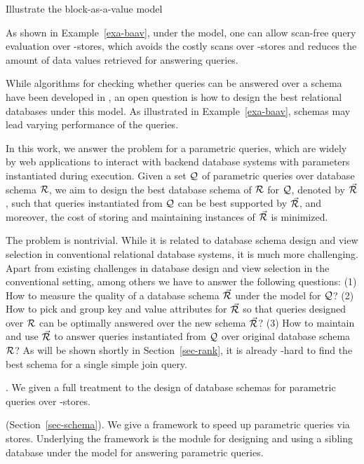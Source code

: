{\begin{example}\label{exa-baav}
Illustrate the block-as-a-value model 
\end{example}

As shown in Example~\ref{exa-baav}, under the \baav
model, one can allow scan-free query evaluation over \kv-stores,
which avoids the costly scans over \kv-stores and reduces the
amount of data values retrieved for answering \SQL queries. 

While algorithms for checking whether queries can be answered
over a \baav 
schema have been developed in
\cite{VLDB19}, an open question is how to design the best
relational databases under this model. As illustrated in
Example~\ref{exa-baav}, schemas may lead varying performance of
the queries.

In this work, we answer the problem for a parametric
queries, which are widely by web applications to interact with
backend database systems with parameters instantiated during
execution. Given a set $\mathcal Q$ of parametric queries over database
schema ${\mathcal R}$, we aim to design the best \baav
database schema of ${\mathcal R}$ for $\mathcal Q$, denoted by $\vec{{\mathcal R}}$,
such that queries instantiated from $\mathcal Q$ can be best supported by
$\vec{{\mathcal R}}$, and moreover, the cost of storing and maintaining
instances of $\vec{{\mathcal R}}$ is minimized. 

The problem is nontrivial. While it is related to \eg database
schema design and view selection in conventional relational
database systems, it is much more challenging. 
Apart from existing challenges in database design and view
selection in the conventional setting, among others we have to
answer the following questions:
(1) How to measure the quality of a database schema $\vec{{\mathcal R}}$
under the \baav model for $\mathcal Q$?
(2) How to pick and group key and value attributes for $\vec{{\mathcal R}}$
so that queries designed over ${\mathcal R}$ can be optimally answered over
the new \baav schema $\vec{{\mathcal R}}$?
(3) How to maintain and use $\vec{{\mathcal R}}$ to answer queries
instantiated from $\mathcal Q$ over original database schema ${\mathcal R}$?
As will be shown shortly in Section~\ref{sec-rank},
it is already \NP-hard to find the best
\baav schema for a single simple join query.



. We given a full treatment to the design of
\baav database schemas for parametric queries over \kv-stores.

 (Section~\ref{sec-schema}). We give a
framework to speed up parametric queries via \baav stores.
Underlying the framework is the module for designing and using a
sibling database under the \baav model for answering parametric
queries.

}
